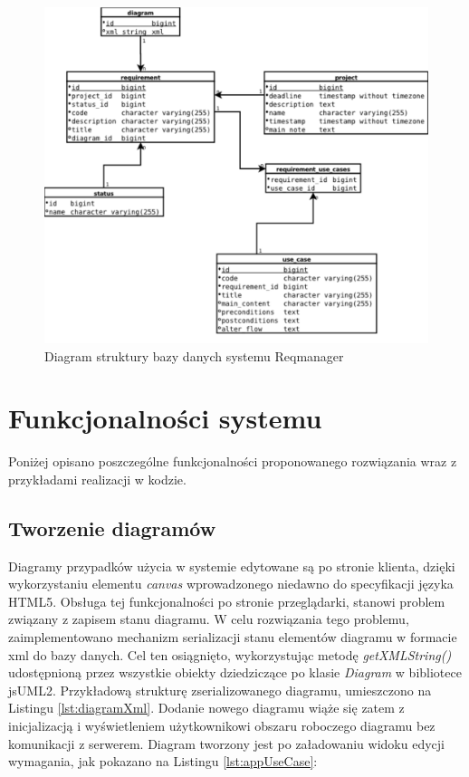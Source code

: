     \begin{figure}[p]
      \centering
      \includegraphics[width=1.0\textwidth]{img/erd2.pdf}
      \caption{Diagram struktury bazy danych systemu Reqmanager}
      \label{fig:erd1}
    \end{figure}

  \section{Funkcjonalności systemu}

    Poniżej opisano poszczególne funkcjonalności proponowanego rozwiązania wraz z przykładami realizacji w kodzie.
  
    \subsection{Tworzenie diagramów}

      Diagramy przypadków użycia w systemie edytowane są po stronie klienta, dzięki wykorzystaniu elementu \emph{canvas} wprowadzonego niedawno do specyfikacji języka HTML5. Obsługa tej funkcjonalności po stronie przeglądarki, stanowi problem związany z zapisem stanu diagramu. W celu rozwiązania tego problemu, zaimplementowano mechanizm serializacji stanu elementów diagramu w formacie xml do bazy danych. Cel ten osiągnięto, wykorzystując metodę \emph{getXMLString()} udostępnioną przez wszystkie obiekty dziedziczące po klasie \emph{Diagram} w bibliotece jsUML2. Przykładową strukturę zserializowanego diagramu, umieszczono na Listingu \ref{lst:diagramXml}. 
      Dodanie nowego diagramu wiąże się zatem z inicjalizacją i wyświetleniem użytkownikowi obszaru roboczego diagramu bez komunikacji z serwerem. Diagram tworzony jest po załadowaniu widoku edycji wymagania, jak pokazano na Listingu \ref{lst:appUseCase}:


